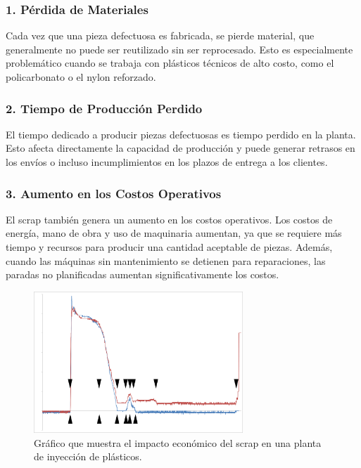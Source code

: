\subsubsection{1. Pérdida de Materiales}

Cada vez que una pieza defectuosa es fabricada, se pierde material, que generalmente no puede ser reutilizado sin ser reprocesado. Esto es especialmente problemático cuando se trabaja con plásticos técnicos de alto costo, como el policarbonato o el nylon reforzado.

\subsubsection{2. Tiempo de Producción Perdido}

El tiempo dedicado a producir piezas defectuosas es tiempo perdido en la planta. Esto afecta directamente la capacidad de producción y puede generar retrasos en los envíos o incluso incumplimientos en los plazos de entrega a los clientes.

\subsubsection{3. Aumento en los Costos Operativos}

El scrap también genera un aumento en los costos operativos. Los costos de energía, mano de obra y uso de maquinaria aumentan, ya que se requiere más tiempo y recursos para producir una cantidad aceptable de piezas. Además, cuando las máquinas sin mantenimiento se detienen para reparaciones, las paradas no planificadas aumentan significativamente los costos.

\begin{figure}[H]
\centering
\includegraphics[width=0.7\textwidth]{img/scrap_fx.png}
\caption{Gráfico que muestra el impacto económico del scrap en una planta de inyección de plásticos.}
\label{fig:scrap_impact}
\end{figure}


